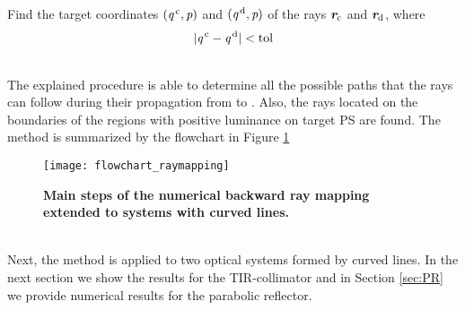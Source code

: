 \begin{algorithm}
\begin{algorithmic}[1]
\State Find the target coordinates $(\textit{q}^{\,\textrm{c}},\textit{p})$ and $(\textit{q}^{\,\textrm{d}},\textit{p})$ of the rays $\textit{\textbf{r}}_{\textrm{c}}$ and $\textit{\textbf{r}}_{\textrm{d}}$, where $$|\textit{q}^{\,\textrm{c}}-\textit{q}^{\,\textrm{d}}|<\textrm{tol}$$
\If {$\lineaj\neq \nline$}
\State{}
\EndIf 
\State{}
\EndIf
\EndProcedure
\end{algorithmic}
\end{algorithm}
\\ \indent The explained procedure is able to determine all the possible paths that the rays can follow during their propagation from  to . Also, the rays located on the boundaries of the regions with positive luminance on target PS  are found.
The method is summarized by the flowchart in Figure \ref{fig:flowchart_raymapping}
\begin{figure}[t]
  \begin{center}
  \texttt{[image: flowchart\_raymapping]}
  \end{center}
  \caption{\textbf{Main steps of the numerical backward ray mapping extended to systems with curved lines.}}
\label{fig:flowchart_raymapping}
 \end{figure}
\\ \indent
Next, the method is applied to two optical systems formed by curved lines. In the next section we show the results for the TIR-collimator and in Section \ref{sec:PR} we provide numerical results for the parabolic reflector.
